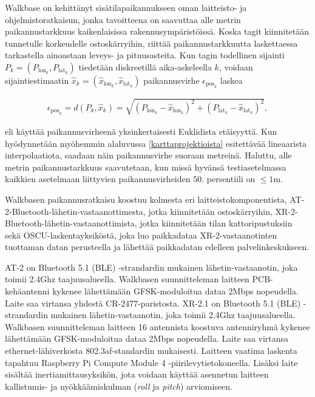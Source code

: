 \documentclass[
  12pt,
  a4paper, twoside]{book}
\begin{document}
Walkbase on kehittänyt sisätilapaikannukseen oman laitteisto- ja ohjelmistoratkaisun, jonka tavoitteena on saavuttaa alle metrin paikannustarkkuus kaikenlaisissa rakennusympäristöissä. Koska tagit kiinnitetään tunnetulle korkeudelle ostoskärryihin, riittää paikannustarkkuutta laskettaessa tarkastella ainoastaan leveys- ja pituusasteita. Kun tagin todellinen sijainti \(P_k=(P_{\text{lon}_k}, P_{\text{lat}_k})\) tiedetään diskreetillä aika-askeleella \(k\), voidaan sijaintiestimaatin \(\hat{x}_k=(\hat{x}_{\text{lon}_k}, \hat{x}_{\text{lat}_k})\) paikannusvirhe \(\epsilon_{\text{pos}_k}\) laskea

\begin{align}\label{paikannusvirhe}
\epsilon_{\text{pos}_k} = d(P_k,\hat{x}_k) = \sqrt{(P_{\text{lon}_k}-\hat{x}_{\text{lon}_k})^2+(P_{\text{lat}_k}-\hat{x}_{\text{lat}_k})^2}
,\end{align}

\noindent eli käyttää paikannusvirheenä yksinkertaisesti Euklidista etäisyyttä. Kun hyödynnetään myöhemmin alaluvussa \ref{karttaprojektioista} esitettävää lineaarista interpolaatiota, saadaan näin paikannusvirhe suoraan metreinä. Haluttu, alle metrin paikannustarkkuus saavutetaan, kun missä hyvänsä testiasetelmassa kaikkien asetelmaan liittyvien paikannusvirheiden \(50.\) persentiili on \(\leq1\)m.

Walkbasen paikannusratkaisu koostuu kolmesta eri laitteistokomponentista, AT-2-Bluetooth-lähetin-vastaanottimesta, jotka kiinnitetään ostoskärryihin, XR-2-Bluetooth-lähetin-vastaanottimista, jotka kiinnitetään tilan kattoripustuksiin sekä OSCU-laskentayksiköstä, joka luo paikkadataa XR-2-vastaanotinten tuottaman datan perusteella ja lähettää paikkadatan edelleen palvelinkeskukseen.

AT-2 on Bluetooth 5.1 (BLE) -strandardin mukainen lähetin-vastaanotin, joka toimii 2.4Ghz taajuusalueella. Walkbasen suunnitteleman laitteen PCB-kehäantenni kykenee lähettämään GFSK-moduloitua dataa 2Mbps nopeudella. Laite saa virtansa yhdestä CR-2477-paristosta. XR-2.1 on Bluetooth 5.1 (BLE) -strandardin mukainen lähetin-vastaanotin, joka toimii 2.4Ghz taajuusalueella. Walkbasen suunnitteleman laitteen 16 antennista koostuva antenniryhmä kykenee lähettämään GFSK-moduloitua dataa 2Mbps nopeudella. Laite saa virtansa ethernet-lähiverkosta 802.3af-standardin mukaisesti. Laitteen vaatima laskenta tapahtuu Raspberry Pi Compute Module 4 -piirilevytietokoneella. Lisäksi laite sisältää inertiamittausyksikön, jota voidaan käyttää asennetun laitteen kallistumis- ja nyökkäämiskulman (\emph{roll} ja \emph{pitch}) arviomiseen.
\end{document}

